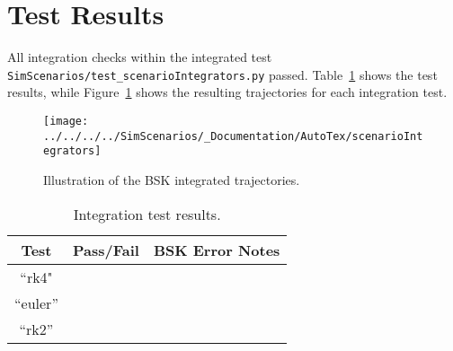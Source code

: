 \section{Test Results}
All integration checks within the integrated test {\tt SimScenarios/test\_scenarioIntegrators.py} passed.  Table~\ref{tbl:intResults} shows the test results, while Figure~\ref{fig:intResults} shows the resulting trajectories for each integration test.

\begin{figure}[t]
	\centerline{
	\texttt{[image: ../../../../SimScenarios/\_Documentation/AutoTex/scenarioIntegrators]}
	}
	\caption{Illustration of the BSK integrated trajectories.}
	\label{fig:intResults}
\end{figure}

\begin{table}[h]
	\caption{Integration test results.}
	\label{tbl:intResults}
	\centering \fontsize{10}{10}\selectfont
	\begin{tabular}{c | c | p{4in} } %
		\hline\hline
		\textbf{Test} 			& \textbf{Pass/Fail} 	 & \textbf{BSK Error Notes} 									        
		\\ \hline
		``rk4"		  	& 
		      	  &
		
	         \\ \hline
		``euler''	   	           	&
		           		&      
		  
		\\ \hline
		``rk2''      	&
		
		   &  
		
\\ 
		\hline\hline
	\end{tabular}
\end{table}
